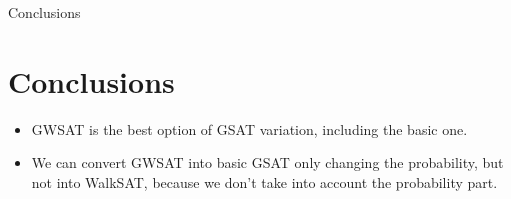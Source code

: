 \documentclass{beamer}
\begin{document}
\begin{frame}{Conclusions}
\section{Conclusions}
\begin{itemize}
\item GWSAT is the best option of GSAT variation, including the basic one.
\item We can convert GWSAT into basic GSAT only changing the probability, but not into WalkSAT, because we don't take into account the probability part.
\end{itemize}
\end{frame}
\end{document}
